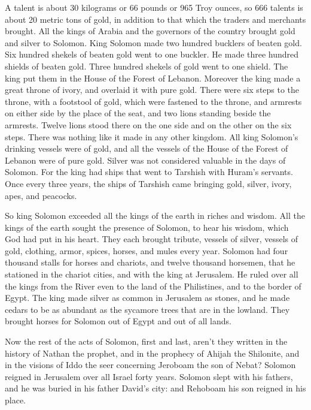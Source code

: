 {{A talent is about 30 kilograms or 66 pounds or 965 Troy ounces, so 666 talents is about 20 metric tons} of gold,
in addition to that which the traders and merchants brought. All the kings of Arabia and the governors of the country brought gold and silver to Solomon.
King Solomon made two hundred bucklers of beaten gold. Six hundred shekels of beaten gold went to one buckler.
He made three hundred shields of beaten gold. Three hundred shekels of gold went to one shield. The king put them in the House of the Forest of Lebanon.
Moreover the king made a great throne of ivory, and overlaid it with pure gold.
There were six steps to the throne, with a footstool of gold, which were fastened to the throne, and armrests on either side by the place of the seat, and two lions standing beside the armrests.
Twelve lions stood there on the one side and on the other on the six steps. There was nothing like it made in any other kingdom.
All king Solomon’s drinking vessels were of gold, and all the vessels of the House of the Forest of Lebanon were of pure gold. Silver was not considered valuable in the days of Solomon.
For the king had ships that went to Tarshish with Huram’s servants. Once every three years, the ships of Tarshish came bringing gold, silver, ivory, apes, and peacocks.
\par }{\PP {}So king Solomon exceeded all the kings of the earth in riches and wisdom.
All the kings of the earth sought the presence of Solomon, to hear his wisdom, which God had put in his heart.
They each brought tribute, vessels of silver, vessels of gold, clothing, armor, spices, horses, and mules every year.
Solomon had four thousand stalls for horses and chariots, and twelve thousand horsemen, that he stationed in the chariot cities, and with the king at Jerusalem.
He ruled over all the kings from the River even to the land of the Philistines, and to the border of Egypt.
The king made silver as common in Jerusalem as stones, and he made cedars to be as abundant as the sycamore trees that are in the lowland.
They brought horses for Solomon out of Egypt and out of all lands.
\par }{\PP {}Now the rest of the acts of Solomon, first and last, aren’t they written in the history of Nathan the prophet, and in the prophecy of Ahijah the Shilonite, and in the visions of Iddo the seer concerning Jeroboam the son of Nebat?
Solomon reigned in Jerusalem over all Israel forty years.
Solomon slept with his fathers, and he was buried in his father David’s city: and Rehoboam his son reigned in his place.

}

